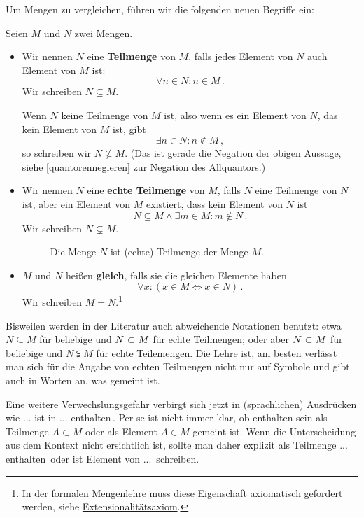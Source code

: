 Um Mengen zu vergleichen, führen wir die folgenden neuen Begriffe ein:
\begin{de}\label{de:Mengenrelationen}
	Seien $M$ und $N$ zwei Mengen.
	\begin{itemize}
	\item Wir nennen $N$ eine \textbf{Teilmenge} von $M$, falls jedes Element von $N$ auch Element von $M$ ist:
		\[\forall n\in N: n\in M \,.\]
		Wir schreiben $N\subseteq M$.
		
		Wenn $N$ keine Teilmenge von $M$ ist, also wenn es ein Element von $N$, das kein Element von $M$ ist, gibt
			\[ \exists n\in N: n\notin M \,, \]
		so schreiben wir $N\nsubseteq M$. (Das ist gerade die Negation der obigen Aussage, siehe \cref{quantorennegieren} zur Negation des Allquantors.)
	\item Wir nennen $N$ eine \textbf{echte Teilmenge} von $M$, falls $N$ eine Teilmenge von $N$ ist, aber ein Element von $M$ existiert, dass kein Element von $N$ ist	
		\[N \subseteq M \wedge \exists m \in M: m \notin N \,.\]
		Wir schreiben $N\subsetneq M$.
		
		\begin{figure}[h]
			\centering \caption{Die Menge $N$ ist (echte) Teilmenge der Menge $M$.}
		\end{figure}
		
	\item $M$ und $N$ heißen \textbf{gleich}, falls sie die gleichen Elemente haben
		\[ \forall x: (x\in M\Leftrightarrow x\in N) \,.\]
		Wir schreiben $M=N$.\footnote{In der formalen Mengenlehre muss diese Eigenschaft axiomatisch gefordert werden, siehe \href{https://de.wikipedia.org/wiki/Extensionalit\%C3\%A4tsaxiom}{Extensionalitätsaxiom}.}
	\end{itemize}
	Bisweilen werden in der Literatur auch abweichende Notationen benutzt: etwa $N\subseteq M$ für beliebige und $N\text{ \reflectbox{$\supset$} }M$ für echte Teilmengen; oder aber $N\text{ \reflectbox{$\supset$} }M$ für beliebige und $N\subsetneqq M$ für echte Teilemengen. Die Lehre ist, am besten verlässt man sich für die Angabe von echten Teilmengen nicht nur auf Symbole und gibt auch in Worten an, was gemeint ist.
	
	Eine weitere Verwechslungsgefahr verbirgt sich jetzt in (sprachlichen) Ausdrücken wie \glqq ... ist in ... enthalten\grqq\,. Per se ist nicht immer klar, ob enthalten sein als Teilmenge $A\subset M$ oder als Element $A\in M$ gemeint ist. Wenn die Unterscheidung aus dem Kontext nicht ersichtlich ist, sollte man daher explizit \glqq als Teilmenge ... enthalten\grqq\, oder \glqq ist Element von ...\grqq\, schreiben.
\end{de}

